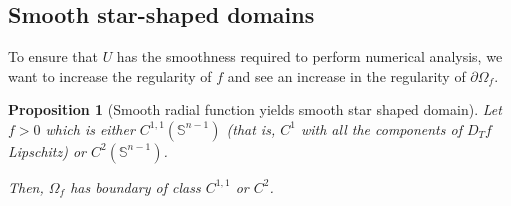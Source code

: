 \documentclass[english,a4paper,9pt,oneside]{scrbook}	%
\theoremstyle{break}
\newtheorem{prop}[equation]{Proposition}
\theoremstyle{remark}
\newcommand{\mS}{\mathbb{S}^{n-1}}
\begin{document}
\subsection{Smooth star-shaped domains}

To ensure that $U$ has the smoothness required to perform numerical analysis, we want to increase the regularity of $f$ and see an increase in the regularity of $\partial \Omega_f$.

\begin{prop}[Smooth radial function yields smooth star shaped domain]
\label{prop:Co_domain}
Let $f>0$ which is either $C^{1,1}(\mS)$ (that is, $C^1$ with all the components of $D_T f$ Lipschitz) or $C^2(\mS)$.  

Then, $\Omega_f$ has boundary of class $C^{1,1}$ or $C^2$.

\end{prop}
\end{document}
